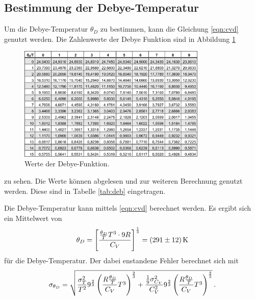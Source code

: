 \subsection{Bestimmung der Debye-Temperatur}
Um die Debye-Temperatur $\theta_D$ zu bestimmen, kann die Gleichung \eqref{eqn:cvd} genutzt werden. Die Zahlenwerte der Debye Funktion sind in Abbildung \ref{fig:cvd}
\begin{figure}
	\centering
	\includegraphics[width=0.8\textwidth]{graphics/cvd.png}
	\caption{Werte der Debye-Funktion.}
	\label{fig:cvd}
\end{figure}
zu sehen.
Die Werte können abgelesen und zur weiteren Berechnung genutzt werden.
Diese sind in Tabelle \ref{tab:deb} eingetragen.

Die Debye-Temperatur kann mittels \eqref{eqn:cvd} berechnet werden.
Es ergibt sich ein Mittelwert von
\begin{equation*}
	\theta_D = \left[\frac{{\frac{\theta_D}{T}}T^3\cdot9R}{C_V}\right]^{\frac{1}{3}} = \SI{291\pm12}{\kelvin}
\end{equation*}
für die Debye-Temperatur.
Der dabei enstandene Fehler berechnet sich mit
\begin{equation*}
	\sigma_{\theta_D} = \sqrt{\frac{\sigma_{T}^{2}}{T^{2}} 9^{\frac{2}{3}} \left(\frac{R {\frac{\theta_D}{T}}}{C_{V}} T^{3}\right)^{\frac{2}{3}} + \frac{\frac{1}{9} \sigma_{C_{V}}^{2}}{C_{V}^{2}} 9^{\frac{2}{3}} \left(\frac{R {\frac{\theta_D}{T}}}{C_{V}} T^{3}\right)^{\frac{2}{3}}}\,\text.
\end{equation*}

